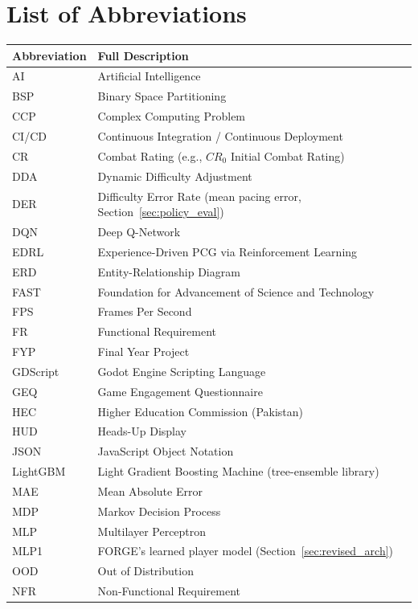 \chapter*{List of Abbreviations}

\begin{longtable}{ll}
\toprule
\textbf{Abbreviation} & \textbf{Full Description} \\
\midrule
AI & Artificial Intelligence \\
BSP & Binary Space Partitioning \\
CCP & Complex Computing Problem \\
CI/CD & Continuous Integration / Continuous Deployment \\
CR & Combat Rating (e.g., $CR_0$ Initial Combat Rating) \\
DDA & Dynamic Difficulty Adjustment \\
DER & Difficulty Error Rate (mean pacing error, Section~\ref{sec:policy_eval}) \\
DQN & Deep Q-Network \\
EDRL & Experience-Driven PCG via Reinforcement Learning \\
ERD & Entity-Relationship Diagram \\
FAST & Foundation for Advancement of Science and Technology \\
FPS & Frames Per Second \\
FR & Functional Requirement \\
FYP & Final Year Project \\
GDScript & Godot Engine Scripting Language \\
GEQ & Game Engagement Questionnaire \\
HEC & Higher Education Commission (Pakistan) \\
HUD & Heads-Up Display \\
JSON & JavaScript Object Notation \\
LightGBM & Light Gradient Boosting Machine (tree-ensemble library) \\
MAE & Mean Absolute Error \\
MDP & Markov Decision Process \\
MLP & Multilayer Perceptron \\
MLP1 & FORGE's learned player model (Section~\ref{sec:revised_arch}) \\
OOD & Out of Distribution \\
NFR & Non-Functional Requirement \\

\end{longtable}
